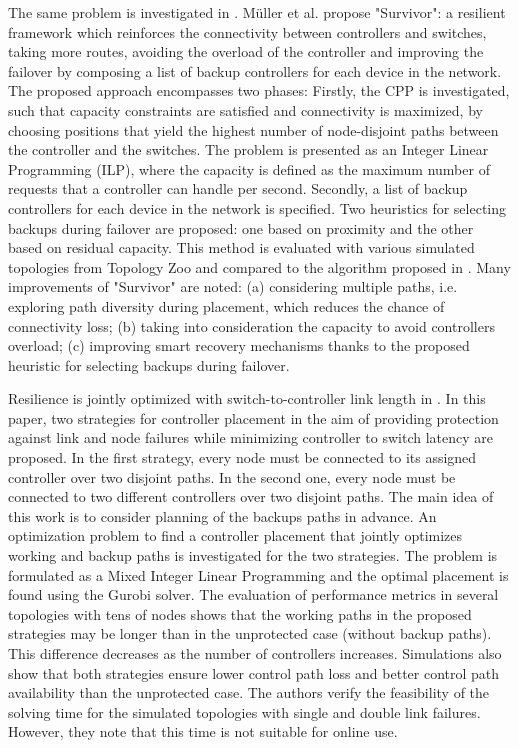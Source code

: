 \documentclass{IEEEtran}
\begin{document}
The same problem is investigated in \cite{MuOl14}. Müller et al. propose "Survivor": a resilient framework which reinforces the connectivity between controllers and switches, taking more routes, avoiding the overload of the controller and improving the failover by composing a list of backup controllers for each device in the network. The proposed approach encompasses two phases: Firstly, the CPP is investigated, such that capacity constraints are satisfied and connectivity is maximized, by choosing positions that yield the highest number of node-disjoint paths between the controller and the switches. The problem is presented as an Integer Linear Programming (ILP), where the capacity is defined as the maximum number of requests that a controller can handle per second. Secondly, a list of backup controllers for each device in the network is specified. Two heuristics for selecting backups during failover are proposed: one based on proximity and the other based on residual capacity. This method is evaluated with various simulated topologies from Topology Zoo and compared to the algorithm proposed in \cite{ZhBe11}. Many improvements of "Survivor" are noted: (a) considering multiple paths, i.e. exploring path diversity during placement, which reduces the chance of connectivity loss; (b) taking into consideration the capacity to avoid controllers overload; (c) improving smart recovery mechanisms thanks to the proposed heuristic for selecting backups during failover.

Resilience is jointly optimized with switch-to-controller link length in \cite{ViMa16}. In this paper, two strategies for controller placement in the aim of providing protection against link and node failures while minimizing controller to switch latency  are proposed. In the first strategy, every node must be connected to its assigned controller over two disjoint paths. In the second one, every node must be connected to two different controllers over two disjoint paths. The main idea of this work is to consider planning of the backups paths in advance. An optimization problem to find a controller placement that jointly optimizes working and backup paths is investigated for the two strategies. The problem is formulated as a Mixed Integer Linear Programming and the optimal placement is found using the Gurobi solver. The evaluation of performance metrics in several topologies with tens of nodes shows that the working paths in the proposed strategies may be longer than in the unprotected case (without backup paths). This difference decreases as the number of controllers increases. Simulations also show that both strategies ensure lower control path loss and better control path availability than the unprotected case. The authors verify the feasibility of the solving time for the simulated topologies with single and double link failures. However, they note that this time is not suitable for online use. %
\end{document}
